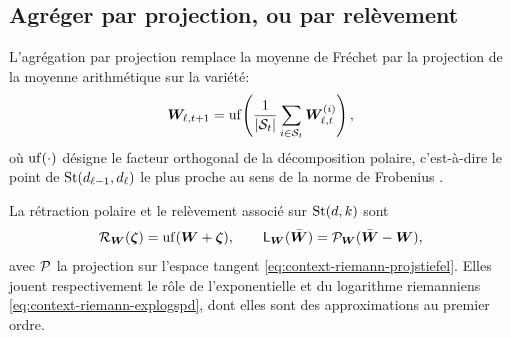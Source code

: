
\subsection{Agréger par projection, ou par relèvement}
\label{sec:spdnet-federe-agregation}

\begin{definition}
\label{def:spdnet-projavg}
  L'agrégation par projection remplace la moyenne de Fréchet par la projection
  de la moyenne arithmétique sur la variété:
  \begin{equation}
    \boldsymbol{W}_{\ell,t+1}
    =
    \operatorname{\operatorname{uf}}\!\left(\frac{1}{|\mathcal{S}_t|}\sum_{i\in\mathcal{S}_t}\boldsymbol{W}_{\ell,t}^{(i)}\right),
    \label{eq:spdnet-projavg}
  \end{equation}
  où $\operatorname{\operatorname{uf}}(\cdot)$ désigne le facteur orthogonal de la décomposition polaire,
  c'est-à-dire le point de $\mathrm{St}(d_{\ell-1},d_{\ell})$ le
  plus proche au sens de la norme de Frobenius
  .
\end{definition}

\begin{definition}
\label{def:spdnet-lift}
  La rétraction polaire et le relèvement associé sur
  $\mathrm{St}(d,k)$ sont
  \begin{equation}
    \mathcal{R}_{\boldsymbol{W}}(\boldsymbol{\zeta})
    =
    \operatorname{\operatorname{uf}}(\boldsymbol{W}+\boldsymbol{\zeta}),
    \qquad
    \mathsf{L}_{\boldsymbol{W}}(\bar{\boldsymbol{W}})
    =
    \mathcal{P}_{\boldsymbol{W}}(\bar{\boldsymbol{W}}-\boldsymbol{W}),
    \label{eq:spdnet-lift}
  \end{equation}
  avec $\mathcal{P}$ la projection sur l'espace tangent
  \cref{eq:context-riemann-projstiefel}. Elles jouent respectivement le rôle de
  l'exponentielle et du logarithme riemanniens
  \cref{eq:context-riemann-explogspd}, dont elles sont des approximations au
  premier ordre.
\end{definition}

